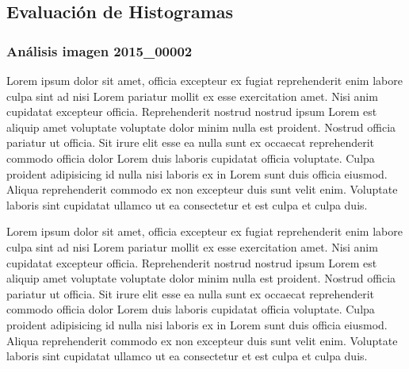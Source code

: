 \documentclass[sigchi]{acmart}
\begin{document}
\newpage
\subsection{Evaluación de Histogramas}

\subsubsection{Análisis imagen 2015\_00002}

Lorem ipsum dolor sit amet, officia excepteur ex fugiat reprehenderit enim labore culpa sint ad
nisi Lorem pariatur mollit ex esse exercitation amet. Nisi anim cupidatat excepteur officia.
Reprehenderit nostrud nostrud ipsum Lorem est aliquip amet voluptate voluptate dolor minim
nulla est proident. Nostrud officia pariatur ut officia. Sit irure elit esse ea nulla sunt ex
occaecat reprehenderit commodo officia dolor Lorem duis laboris cupidatat officia voluptate.
Culpa proident adipisicing id nulla nisi laboris ex in Lorem sunt duis officia eiusmod. Aliqua
reprehenderit commodo ex non excepteur duis sunt velit enim. Voluptate laboris sint cupidatat
ullamco ut ea consectetur et est culpa et culpa duis.

Lorem ipsum dolor sit amet, officia excepteur ex fugiat reprehenderit enim labore culpa sint ad
nisi Lorem pariatur mollit ex esse exercitation amet. Nisi anim cupidatat excepteur officia.
Reprehenderit nostrud nostrud ipsum Lorem est aliquip amet voluptate voluptate dolor minim
nulla est proident. Nostrud officia pariatur ut officia. Sit irure elit esse ea nulla sunt ex
occaecat reprehenderit commodo officia dolor Lorem duis laboris cupidatat officia voluptate.
Culpa proident adipisicing id nulla nisi laboris ex in Lorem sunt duis officia eiusmod. Aliqua
reprehenderit commodo ex non excepteur duis sunt velit enim. Voluptate laboris sint cupidatat
ullamco ut ea consectetur et est culpa et culpa duis.
\end{document}
